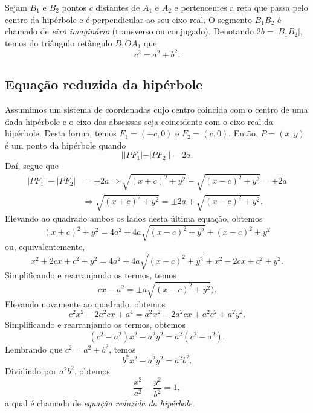Sejam $B_1$ e $B_2$ pontos $c$ distantes de $A_1$ e $A_2$ e pertencentes a reta que passa pelo centro da hipérbole e é perpendicular ao seu eixo real. O segmento $B_1B_2$ é chamado de \emph{eixo imaginário} (transverso ou conjugado). Denotando $2b=|B_1B_2|$, temos do triângulo retângulo $B_1OA_1$ que
\begin{equation}
  c^2 = a^2 + b^2.
\end{equation}

\subsection{Equação reduzida da hipérbole}

Assumimos um sistema de coordenadas cujo centro coincida com o centro de uma dada hipérbole e o eixo das abscissas seja coincidente com o eixo real da hipérbole. Desta forma, temos $F_1 = (-c,0)$ e $F_2 = (c,0)$. Então, $P=(x,y)$ é um ponto da hipérbole quando
\begin{equation}
  ||PF_1|-|PF_2|| = 2a.
\end{equation}
Daí, segue que
\begin{align}
  |PF_1|-|PF_2| &= \pm 2a \Rightarrow \sqrt{(x+c)^2+y^2}-\sqrt{(x-c)^2+y^2}=\pm 2a\\
                &\Rightarrow \sqrt{(x+c)^2+y^2} = \pm 2a + \sqrt{(x-c)^2+y^2}.
\end{align}
Elevando ao quadrado ambos os lados desta última equação, obtemos
\begin{equation}
  (x+c)^2+y^2 = 4a^2 \pm 4a\sqrt{(x-c)^2+y^2} + (x-c)^2+y^2
\end{equation}
ou, equivalentemente,
\begin{equation}
  x^2+2cx+c^2+y^2=4a^2\pm4a\sqrt{(x-c)^2+y^2}+x^2-2cx+c^2+y^2.
\end{equation}
Simplificando e rearranjando os termos, temos
\begin{equation}
  cx - a^2 = \pm a\sqrt{(x-c)^2+y^2}).
\end{equation}
Elevando novamente ao quadrado, obtemos
\begin{equation}
  c^2x^2 - 2a^2cx + a^4 = a^2x^2 - 2a^2cx + a^2c^2 + a^2y^2.
\end{equation}
Simplificando e rearranjando os termos, obtemos
\begin{equation}
  (c^2-a^2)x^2 - a^2y^2 = a^2(c^2-a^2).
\end{equation}
Lembrando que $c^2 = a^2 + b^2$, temos
\begin{equation}
  b^2x^2 - a^2y^2 = a^2b^2.
\end{equation}
Dividindo por $a^2b^2$, obtemos
\begin{equation}
  \frac{x^2}{a^2} - \frac{y^2}{b^2} = 1,
\end{equation}
a qual é chamada de \emph{equação reduzida da hipérbole}.

